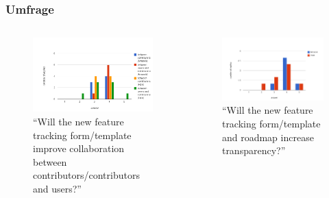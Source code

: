 \documentclass{beamer}
\begin{document}
\begin{frame}
\frametitle{Umfrage}
\begin{columns}
   \begin{figure}[h!]
    \centering
    \includegraphics[scale=0.25,keepaspectratio=true]{./amarok3bchalo3bc.png}
    \caption{``Will the new feature tracking form/template improve collaboration between contributors/contributors and users?''}
   \end{figure}
   \begin{figure}[h!]
    \centering
    \includegraphics[scale=0.25,keepaspectratio=true]{./amarok3dhalo3d.png}
    \caption{``Will the new feature tracking form/template and roadmap increase transparency?''}
   \end{figure}
\end{columns}
\end{frame}
\end{document}
